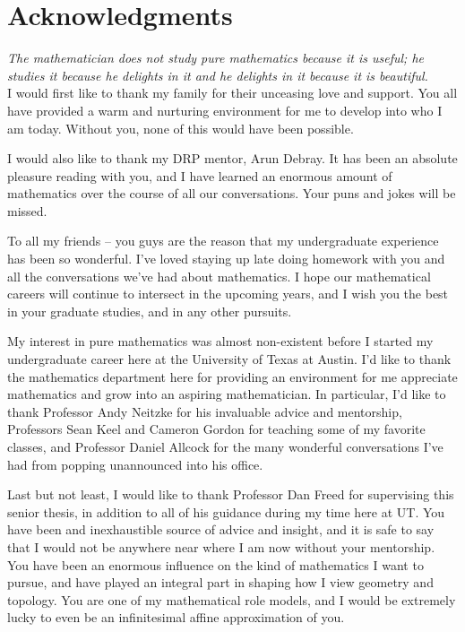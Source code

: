 %
\chapter*{Acknowledgments}
%

%
\subsectionend $ $\\
%
\emph{The mathematician does not study pure mathematics because it is useful;
he studies it because he delights in it and he delights in it because it
is beautiful.} \\
%
%
\subsectionend $ $\\
%

I would first like to thank my family for their unceasing love and support.
You all have provided a warm and nurturing environment for me to develop into
who I am today. Without you, none of this would have been possible.

I would also like to thank my DRP mentor, Arun Debray. It has been an absolute
pleasure reading with you, and I have learned an enormous amount of mathematics
over the course of all our conversations. Your puns and jokes will be missed.

To all my friends -- you guys are the reason that my undergraduate experience
has been so wonderful. I've loved staying up late doing homework with you and
all the conversations we've had about mathematics. I hope our mathematical
careers will continue to intersect in the upcoming years, and I wish you
the best in your graduate studies, and in any other pursuits.

My interest in pure mathematics was almost non-existent before I started my
undergraduate career here at the University of Texas at Austin. I'd like to
thank the mathematics department here for providing an environment for me
appreciate mathematics and grow into an aspiring mathematician. In particular,
I'd like to thank Professor Andy Neitzke for his invaluable advice and mentorship,
Professors Sean Keel and Cameron Gordon for teaching some of my favorite classes,
and Professor Daniel Allcock for the many wonderful conversations I've had
from popping unannounced into his office.

Last but not least, I would like to thank Professor Dan Freed for supervising
this senior thesis, in addition to all of his guidance during my time here at UT.
You have been and inexhaustible source of advice and insight, and it is safe to
say that I would not be anywhere near where I am now without your mentorship.
You have been an enormous influence on the kind of mathematics I want to
pursue, and have played an integral part in shaping how I view geometry
and topology. You are one of my mathematical role models, and I would be extremely
lucky to even be an infinitesimal affine approximation of you.
%